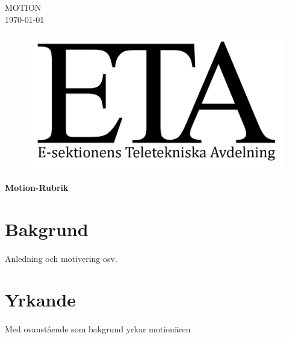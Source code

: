 \documentclass[a4paper, 12pt]{article}
\begin{document}
\titlespacing{\subsection}{0pt}{\parskip}{-\parskip}
\titlespacing{\subsubsection}{0pt}{\parskip}{-\parskip}

\flushright
MOTION\\
\today

\flushleft

\begin{figure}[h]
    \includegraphics[scale = 2.4]{ETA-logga.png}
\end{figure}
{\LARGE \textbf{Motion-Rubrik}}
\newline
\hrulefill

\section*{Bakgrund}
\paragraph{}
Anledning och motivering osv.


\section*{Yrkande}
\paragraph{}
Med ovanstående som bakgrund yrkar motionären
\end{document}

